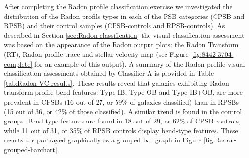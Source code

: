 After completing the Radon profile classification exercise we investigated the distribution of the Radon profile types in each of the PSB categories (CPSB and RPSB) and their control samples (CPSB-controls and RPSB-controls). As described in Section \ref{sec:Radon-classification} the visual classification assessment was based on the appearance of the Radon output plots: the Radon Transform (RT), Radon profile trace and stellar velocity map (see Figure \ref{fig:8442-3704-complete} for an example of this output). A summary of the Radon profile visual classification assessments obtained by Classifier A is provided in Table \ref{tab:Radon-VC-results}. These results reveal that galaxies exhibiting Radon transform profile bend features: Type-IB, Type-OB and Type-IB+OB, are more prevalent in CPSBs (16 out of 27, or 59\% of galaxies classified) than in RPSBs (15 out of 36, or 42\% of those classified). A similar trend is found in the control groups. Bend-type features are found in 18 out of 29, or 62\% of CPSB controls, while 11 out of 31, or 35\% of RPSB controls display bend-type features. These results are portrayed graphically as a grouped bar graph in Figure \ref{fig:Radon-grouped-barchart}.

